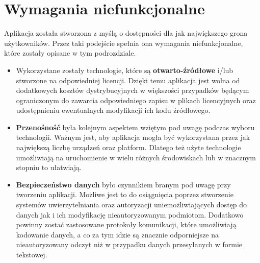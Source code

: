 \section{Wymagania niefunkcjonalne}
Aplikacja została stworzona z myślą o dostępności dla jak największego grona użytkowników.
Przez taki podejście spełnia ona wymagania niefunkcjonalne, które zostały opisane w tym podrozdziale.
\begin{itemize}
  \item Wykorzystane zostały technologie, które są \textbf{otwarto-źródłowe} i/lub stworzone na odpowiedniej
    licencji. Dzięki temu aplikacja jest wolna od dodatkowych kosztów dystrybucyjnych w większości
    przypadków będącym ograniczonym do zawarcia odpowiedniego zapisu w plikach licencyjnych oraz
    udostępnieniu ewentualnych modyfikacji ich kodu źródłowego.
  \item \textbf{Przenośność} była kolejnym aspektem wziętym pod uwagę podczas wyboru technologii. Ważnym jest,
    aby aplikacja mogła być wykorzystana przez jak największą liczbę urządzeń oraz platform. Dlatego też
    użyte technologie umożliwiają na uruchomienie w wielu różnych środowiskach lub w znacznym stopniu to ułatwiają.
  \item \textbf{Bezpieczeństwo danych} było czynnikiem branym pod uwagę przy tworzeniu aplikacji. 
    Możliwe jest to do osiągnięcia poprzez stworzenie systemów uwierzytelniania oraz autoryzacji uniemożliwiających
    dostęp do danych jak i ich modyfikację nieautoryzowanym podmiotom. Dodatkowo powinny zostać zastosowane
    protokoły komunikacji, które umożliwiają kodowanie danych, a co za tym idzie są znacznie odporniejsze
    na nieautoryzowany odczyt niż w przypadku danych przesyłanych w formie tekstowej.
\end{itemize}

